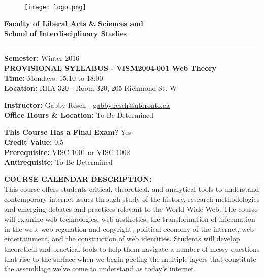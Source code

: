 \documentclass[10pt]{article}
\begin{document}
\begin{figure}
	\raggedleft
	\texttt{[image: logo.png]}
\end{figure}

\textbf{\LARGE{Faculty of Liberal Arts \& Sciences and \\
School of Interdisciplinary Studies}}\newline
\rule{\textwidth}{1pt}

\textbf{Semester:} Winter 2016\\
\textbf{PROVISIONAL SYLLABUS - VISM2004-001 Web Theory}\\
\textbf{Time:} Mondays, 15:10 to 18:00\\
\textbf{Location:} RHA 320 - Room 320, 205 Richmond St. W

\textbf{Instructor:} Gabby Resch - \href{mailto:gabby.resch@utoronto.ca}{gabby.resch@utoronto.ca}\\
\textbf{Office Hours \& Location:} To Be Determined

\textbf{This Course Has a Final Exam?} Yes\\
\textbf{Credit Value:} 0.5\\
\textbf{Prerequisite:} VISC-1001 or VISC-1002\\
\textbf{Antirequisite:} To Be Determined

\textbf{COURSE CALENDAR DESCRIPTION:}\\
This course offers students critical, theoretical, and analytical tools to understand contemporary internet issues through study of the history, research methodologies and emerging debates and practices relevant to the World Wide Web. The course will examine web technologies, web aesthetics, the transformation of information in the web, web regulation and copyright, political economy of the internet, web entertainment, and the construction of web identities. Students will develop theoretical and practical tools to help them navigate a number of messy questions that rise to the surface when we begin peeling the multiple layers that constitute the assemblage we've come to understand as today's internet.
\end{document}
